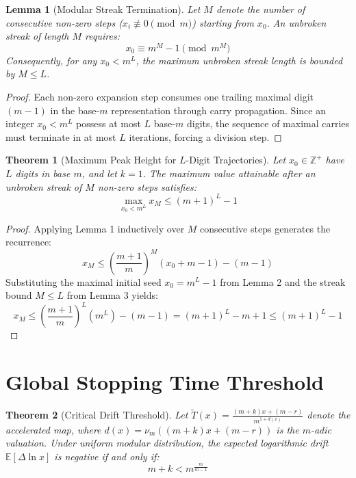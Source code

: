\documentclass[11pt,a4paper]{article}
\theoremstyle{plain}
\newtheorem{theorem}{Theorem}
\newtheorem{lemma}{Lemma}
\theoremstyle{definition}
\begin{document}
\begin{lemma}[Modular Streak Termination]
Let $M$ denote the number of consecutive non-zero steps ($x_i \not\equiv 0 \pmod m$) starting from $x_0$. An unbroken streak of length $M$ requires:
\begin{equation}
x_0 \equiv m^M - 1 \pmod{m^M}
\end{equation}
Consequently, for any $x_0 < m^L$, the maximum unbroken streak length is bounded by $M \le L$.
\end{lemma}

\begin{proof}
Each non-zero expansion step consumes one trailing maximal digit $(m-1)$ in the base-$m$ representation through carry propagation. Since an integer $x_0 < m^L$ possess at most $L$ base-$m$ digits, the sequence of maximal carries must terminate in at most $L$ iterations, forcing a division step.
\end{proof}

\begin{theorem}[Maximum Peak Height for $L$-Digit Trajectories]
Let $x_0 \in \mathbb{Z}^+$ have $L$ digits in base $m$, and let $k=1$. The maximum value attainable after an unbroken streak of $M$ non-zero steps satisfies:
\begin{equation}
\max_{x_0 < m^L} x_M \le (m+1)^L - 1
\end{equation}
\end{theorem}

\begin{proof}
Applying Lemma 1 inductively over $M$ consecutive steps generates the recurrence:
\begin{equation}
x_M \le \left(\frac{m+1}{m}\right)^M (x_0 + m - 1) - (m - 1)
\end{equation}
Substituting the maximal initial seed $x_0 = m^L - 1$ from Lemma 2 and the streak bound $M \le L$ from Lemma 3 yields:
\begin{equation}
x_M \le \left(\frac{m+1}{m}\right)^L (m^L) - (m-1) = (m+1)^L - m + 1 \le (m+1)^L - 1
\end{equation}
\end{proof}

\section{Global Stopping Time Threshold}

\begin{theorem}[Critical Drift Threshold]
Let $\widetilde{T}(x) = \frac{(m+k)x + (m - r)}{m^{1 + d(x)}}$ denote the accelerated map, where $d(x) = \nu_m((m+k)x + (m-r))$ is the $m$-adic valuation. Under uniform modular distribution, the expected logarithmic drift $\mathbb{E}[\Delta \ln x]$ is negative if and only if:
\begin{equation}
m + k < m^{\frac{m}{m-1}}
\end{equation}
\end{theorem}
\end{document}

